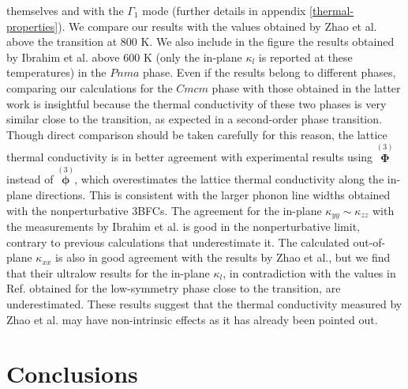 themselves and with the $\Gamma_1$ mode (further details in appendix \ref{thermal-properties}). We compare our results with the values obtained by Zhao et al.\cite{zhao2014ultralow} above the transition at $800$ K. We also include in the figure the results 
obtained by Ibrahim et al.\cite{ibrahim2017reinvestigation} above $600$ K (only the in-plane $\kappa_l$ is reported at these temperatures) in the $Pnma$ phase. Even if the results belong to different phases, comparing our 
calculations for the $Cmcm$ phase with those obtained in the latter work is insightful because the thermal conductivity of these two phases is very similar close to the transition, as expected in a second-order phase 
transition. \\

Though direct comparison should be taken carefully for this reason, the lattice thermal conductivity is in better agreement with experimental results using $\overset{(3)}{\boldsymbol{\Phi}}$ instead 
of $\overset{(3)}{\boldsymbol{\phi}}$, which overestimates the lattice thermal conductivity along the in-plane directions. This is consistent with the larger phonon line widths obtained with the nonperturbative 3BFCs. The 
agreement for the in-plane $\kappa_{yy} \sim \kappa_{zz}$ with the measurements by Ibrahim et al.\cite{ibrahim2017reinvestigation} is good in the nonperturbative limit, contrary to previous calculations that 
underestimate it\cite{skelton2016anharmonicity}. The calculated out-of-plane $\kappa_{xx}$ is also in good agreement with the results by Zhao et al.\cite{zhao2014ultralow}, but we find that their ultralow results for the 
in-plane $\kappa_l$, in contradiction with the values in Ref. \cite{ibrahim2017reinvestigation} obtained for the low-symmetry phase close to the transition, are underestimated. These results suggest that the thermal 
conductivity measured by Zhao et al. may have non-intrinsic effects as it has already been pointed out\cite{wei2016intrinsic}.

\section{Conclusions}

